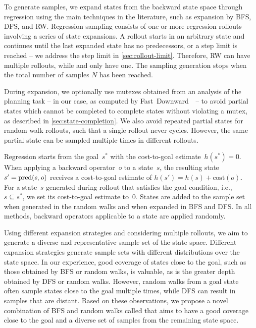 To generate samples, we expand states from the backward state space through regression using the main techniques in the literature, such as expansion by BFS, DFS, and RW. Regression sampling consists of one or more regression rollouts involving a series of state expansions. A rollout starts in an arbitrary state and continues until the last expanded state has no predecessors, or a step limit is reached -- we address the step limit in \cref{sec:rollout-limit}. Therefore, RW can have multiple rollouts, while \bfs and \dfs only have one. The sampling generation stops when the total number of samples $N$ has been reached.

During expansion, we optionally use mutexes obtained from an analysis of the planning task -- in our case, as computed by Fast~Downward~\cite{helmert2006fast}~-- to avoid partial states which cannot be completed to complete states without violating a mutex, as described in \cref{sec:state-completion}. We also avoid repeated partial states for random walk rollouts, such that a single rollout never cycles. However, the same partial state can be sampled multiple times in different rollouts.

Regression starts from the goal~$s^*$ with the cost-to-goal estimate~$h(s^*)=0$. When applying a backward operator~$o$ to a state~$s$, the resulting state~$s' = \operatorname{pred}(s, o)$ receives a cost-to-goal estimate of $h(s') = h(s) + \text{cost}(o)$. For a state~$s$ generated during rollout that satisfies the goal condition, i.e.,~$s \subseteq s^*$, we set its cost-to-goal estimate to~$0$. States are added to the sample set when generated in the random walks and when expanded in BFS and DFS. In all methods, backward operators applicable to a state are applied randomly.

Using different expansion strategies and considering multiple rollouts, we aim to generate a diverse and representative sample set of the state space. Different expansion strategies generate sample sets with different distributions over the state space. In our experience, good coverage of states close to the goal, such as those obtained by BFS or random walks, is valuable, as is the greater depth obtained by DFS or random walks. However, random walks from a goal state often sample states close to the goal multiple times, while DFS can result in samples that are distant. Based on these observations, we propose a novel combination of BFS and random walks called \bfsrw that aims to have a good coverage close to the goal and a diverse set of samples from the remaining state space.

